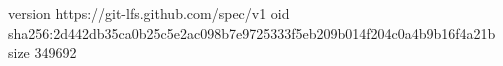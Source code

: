 version https://git-lfs.github.com/spec/v1
oid sha256:2d442db35ca0b25c5e2ac098b7e9725333f5eb209b014f204c0a4b9b16f4a21b
size 349692
